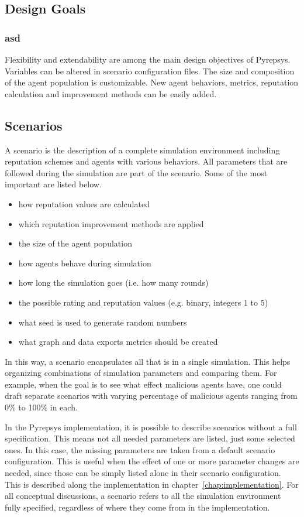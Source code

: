 \documentclass[%
    ]{\PathToTumTemplate/thesis/tum_thesis}
\begin{document}
\subsection{Design Goals}
\subsubsection{asd}
Flexibility and extendability are among the main design objectives of Pyrepsys.
Variables can be altered in scenario configuration files.
The size and composition of the agent population is customizable.
New agent behaviors, metrics, reputation calculation and improvement methods can be easily added.



\subsection{Scenarios}\label{sec:scenario}
A \gls{scenario} is the description of a complete simulation environment including reputation schemes and agents with various behaviors.
All parameters that are followed during the simulation are part of the scenario.
Some of the most important are listed below.

\begin{itemize}
	\item how reputation values are calculated
	\item which reputation improvement methods are applied
	\item the size of the agent population
	\item how agents behave during simulation
	\item how long the simulation goes (i.e. how many rounds)
	\item the possible rating and reputation values (e.g. binary, integers 1 to 5)
	\item what seed is used to generate random numbers
	\item what graph and data exports metrics should be created
\end{itemize}

In this way, a scenario encapsulates all that is in a single simulation.
This helps organizing combinations of simulation parameters and comparing them.
For example, when the goal is to see what effect malicious agents have, one could draft separate scenarios with varying percentage of malicious agents ranging from 0\% to 100\% in each.

In the Pyrepsys implementation, it is possible to describe scenarios without a full specification.
This means not all needed parameters are listed, just some selected ones.
In this case, the missing parameters are taken from a default scenario configuration.
This is useful when the effect of one or more parameter changes are needed, since those can be simply listed alone in their scenario configuration.
This is described along the implementation in chapter~\ref{chap:implementation}.
For all conceptual discussions, a scenario refers to all the simulation environment fully specified, regardless of where they come from in the implementation.
\end{document}
